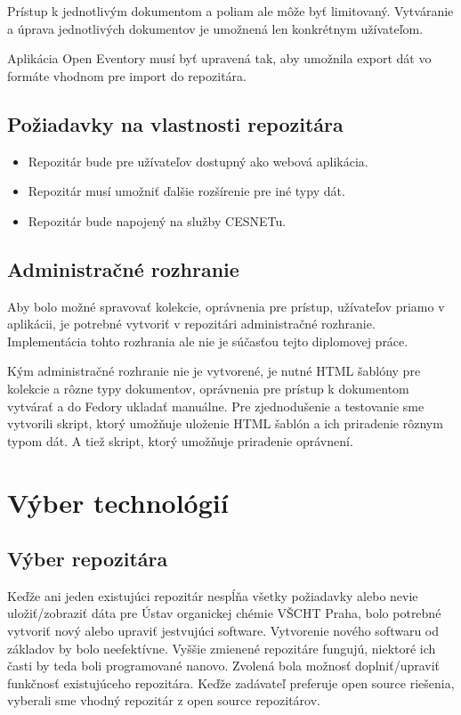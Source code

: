 \documentclass[thesis=M,slovak]{FITthesis}[2013/05/06]
\begin{document}
Prístup k jednotlivým dokumentom a poliam ale môže byť limitovaný. Vytváranie a úprava jednotlivých dokumentov je umožnená len konkrétnym užívateľom.

Aplikácia Open Eventory musí byť upravená tak, aby umožnila export dát vo formáte vhodnom pre import do repozitára.

\section{Požiadavky na vlastnosti repozitára}
\begin{itemize}
	\item Repozitár bude pre užívateľov dostupný ako webová aplikácia.
	\item Repozitár musí umožniť ďalšie rozšírenie pre iné typy dát.
	\item Repozitár bude napojený na služby CESNETu.
\end{itemize}

\section{Administračné rozhranie}\label{AdministracneRozhranie}
Aby bolo možné spravovať kolekcie, oprávnenia pre prístup, užívateľov priamo v aplikácii, je potrebné vytvoriť v repozitári administračné rozhranie. Implementácia tohto rozhrania ale nie je súčasťou tejto diplomovej práce. 

Kým administračné rozhranie nie je vytvorené, je nutné HTML šablóny pre kolekcie a rôzne typy dokumentov, oprávnenia pre prístup k dokumentom vytvárať a do Fedory ukladať manuálne. Pre zjednodušenie a testovanie sme vytvorili skript, ktorý umožňuje uloženie HTML šablón a ich priradenie rôznym typom dát. A tiež skript, ktorý umožňuje priradenie oprávnení.

\chapter{Výber technológií}
\section{Výber repozitára}
Keďže ani jeden existujúci repozitár nespĺňa všetky požiadavky alebo nevie uložiť/zobraziť dáta pre Ústav organickej chémie VŠCHT Praha, bolo potrebné vytvoriť nový alebo upraviť jestvujúci software. Vytvorenie nového softwaru od základov by bolo neefektívne. Vyššie zmienené repozitáre fungujú, niektoré ich časti by teda boli programované nanovo. Zvolená bola možnosť doplniť/upraviť funkčnosť existujúceho repozitára. Keďže zadávateľ preferuje open source riešenia, vyberali sme vhodný repozitár z open source repozitárov.
\end{document}
